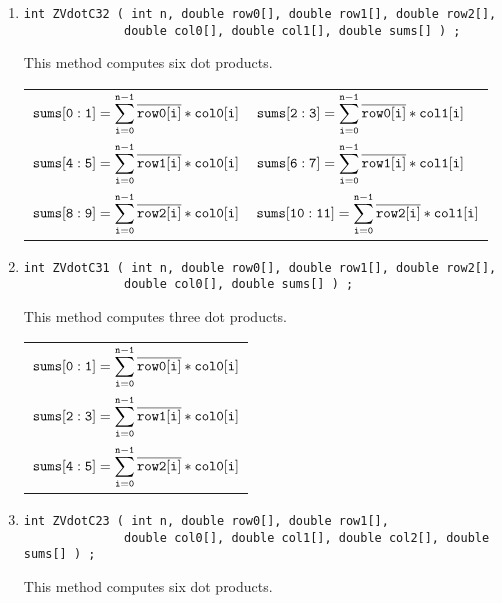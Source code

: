 \begin{enumerate}
\item
\begin{verbatim}
int ZVdotC32 ( int n, double row0[], double row1[], double row2[], 
              double col0[], double col1[], double sums[] ) ;
\end{verbatim}
This method computes six dot products.
\par
\begin{tabular}{ll}
$\displaystyle{\tt sums[0:1]}
= \sum_{\tt i = 0}^{\tt n-1} \overline{\tt row0[i]} * {\tt col0[i]}$ &
$\displaystyle{\tt sums[2:3]}
= \sum_{\tt i = 0}^{\tt n-1} \overline{\tt row0[i]} * {\tt col1[i]}$ \\
$\displaystyle{\tt sums[4:5]}
= \sum_{\tt i = 0}^{\tt n-1} \overline{\tt row1[i]} * {\tt col0[i]}$ &
$\displaystyle{\tt sums[6:7]}
= \sum_{\tt i = 0}^{\tt n-1} \overline{\tt row1[i]} * {\tt col1[i]}$ \\
$\displaystyle{\tt sums[8:9]}
= \sum_{\tt i = 0}^{\tt n-1} \overline{\tt row2[i]} * {\tt col0[i]}$ &
$\displaystyle{\tt sums[10:11]}
= \sum_{\tt i = 0}^{\tt n-1} \overline{\tt row2[i]} * {\tt col1[i]}$
\end{tabular}
\item
\begin{verbatim}
int ZVdotC31 ( int n, double row0[], double row1[], double row2[], 
              double col0[], double sums[] ) ;
\end{verbatim}
This method computes three dot products.
\par
\begin{tabular}{l}
$\displaystyle{\tt sums[0:1]}
= \sum_{\tt i = 0}^{\tt n-1} \overline{\tt row0[i]} * {\tt col0[i]}$ \\
$\displaystyle{\tt sums[2:3]}
= \sum_{\tt i = 0}^{\tt n-1} \overline{\tt row1[i]} * {\tt col0[i]}$ \\
$\displaystyle{\tt sums[4:5]}
= \sum_{\tt i = 0}^{\tt n-1} \overline{\tt row2[i]} * {\tt col0[i]}$ 
\end{tabular}
\item
\begin{verbatim}
int ZVdotC23 ( int n, double row0[], double row1[],         
              double col0[], double col1[], double col2[], double sums[] ) ;
\end{verbatim}
This method computes six dot products.

\end{enumerate}
